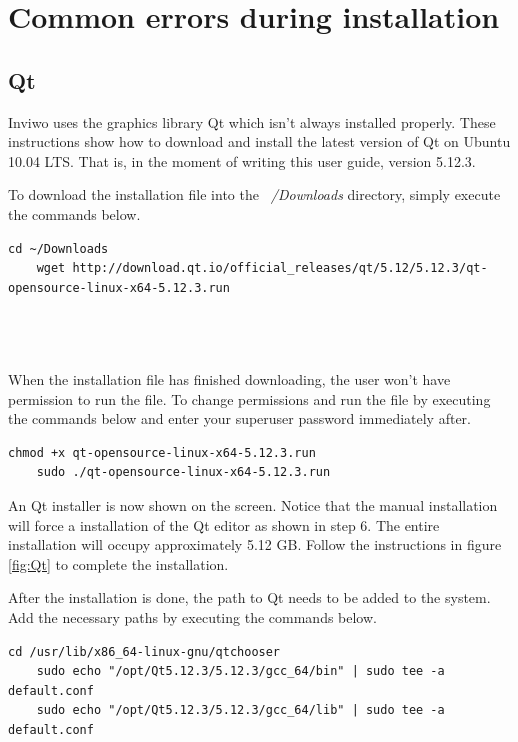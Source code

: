 \section{Common errors during installation}
\subsection{Qt}
Inviwo uses the graphics library Qt which isn't always installed properly. These instructions show how to download and install the latest version of Qt on Ubuntu 10.04 LTS. That is, in the moment of writing this user guide, version 5.12.3. 

To download the installation file into the \emph{~/Downloads} directory, simply execute the commands below.

\begin{lstlisting}[frame = single, breaklines=true]
    cd ~/Downloads
    wget http://download.qt.io/official_releases/qt/5.12/5.12.3/qt-opensource-linux-x64-5.12.3.run
    
    
    
\end{lstlisting}

When the installation file has finished downloading, the user won't have permission to run the file. To change permissions and run the file by executing the commands below and enter your superuser password immediately after.
\begin{lstlisting}[frame = single, breaklines=true]
    chmod +x qt-opensource-linux-x64-5.12.3.run
    sudo ./qt-opensource-linux-x64-5.12.3.run
\end{lstlisting}

An Qt installer is now shown on the screen. Notice that the manual installation will force a installation of the Qt editor as shown in step 6. The entire installation will occupy approximately 5.12 GB. Follow the instructions in figure \ref{fig:Qt} to complete the installation.

After the installation is done, the path to Qt needs to be added to the system. Add the necessary paths by executing the commands below.

\begin{lstlisting}[frame = single, breaklines=true]
    cd /usr/lib/x86_64-linux-gnu/qtchooser
    sudo echo "/opt/Qt5.12.3/5.12.3/gcc_64/bin" | sudo tee -a default.conf
    sudo echo "/opt/Qt5.12.3/5.12.3/gcc_64/lib" | sudo tee -a default.conf
\end{lstlisting}

